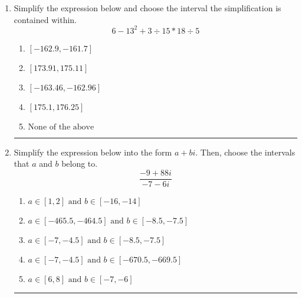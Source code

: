 \documentclass[14pt]{extbook}
\newcommand{\litem}[1]{\item#1\hspace*{-1cm}\rule{\textwidth}{0.4pt}}
\begin{document}
\begin{enumerate}
{\begin{enumerate}[label=\Alph*.]
\end{enumerate} }
\litem{
Simplify the expression below and choose the interval the simplification is contained within.\[ 6 - 13^2 + 3 \div 15 * 18 \div 5 \]\begin{enumerate}[label=\Alph*.]
\item \( [-162.9, -161.7] \)
\item \( [173.91, 175.11] \)
\item \( [-163.46, -162.96] \)
\item \( [175.1, 176.25] \)
\item \( \text{None of the above} \)

\end{enumerate} }
\litem{
Simplify the expression below into the form $a+bi$. Then, choose the intervals that $a$ and $b$ belong to.\[ \frac{-9 + 88 i}{-7 - 6 i} \]\begin{enumerate}[label=\Alph*.]
\item \( a \in [1, 2] \text{ and } b \in [-16, -14] \)
\item \( a \in [-465.5, -464.5] \text{ and } b \in [-8.5, -7.5] \)
\item \( a \in [-7, -4.5] \text{ and } b \in [-8.5, -7.5] \)
\item \( a \in [-7, -4.5] \text{ and } b \in [-670.5, -669.5] \)
\item \( a \in [6, 8] \text{ and } b \in [-7, -6] \)

\end{enumerate} }
\end{enumerate}
\end{document}
